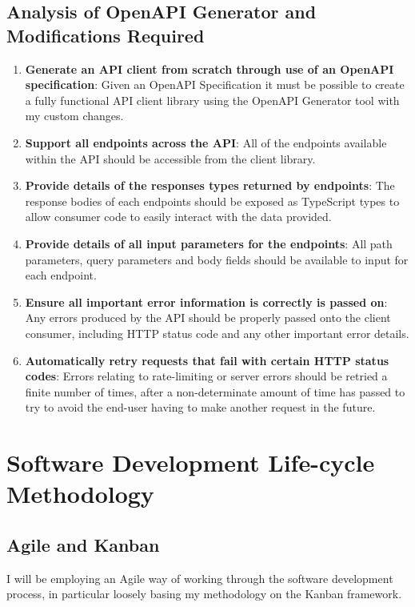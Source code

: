\subsection{Analysis of OpenAPI Generator and Modifications Required}
\begin{enumerate}
    \item \textbf{Generate an API client from scratch through use of an OpenAPI specification}: Given an OpenAPI Specification it must be possible to create a fully functional API client library using the OpenAPI Generator tool with my custom changes.
    \item \textbf{Support all endpoints across the API}: All of the endpoints available within the API should be accessible from the client library.
    \item \textbf{Provide details of the responses types returned by endpoints}: The response bodies of each endpoints should be exposed as TypeScript types to allow consumer code to easily interact with the data provided.
    \item \textbf{Provide details of all input parameters for the endpoints}: All path parameters, query parameters and body fields should be available to input for each endpoint.
    \item \textbf{Ensure all important error information is correctly is passed on}: Any errors produced by the API should be properly passed onto the client consumer, including HTTP status code and any other important error details.
    \item \textbf{Automatically retry requests that fail with certain HTTP status codes}: Errors relating to rate-limiting or server errors should be retried a finite number of times, after a non-determinate amount of time has passed to try to avoid the end-user having to make another request in the future.
\end{enumerate}

\section{Software Development Life-cycle Methodology}

\subsection{Agile and Kanban}

I will be employing an Agile way of working through the software development process, in particular loosely basing my methodology on the Kanban framework.

